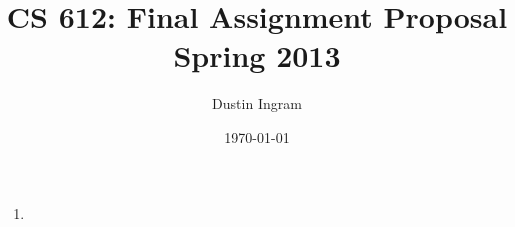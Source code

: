 \documentclass{article}
\title{CS 612: Final Assignment Proposal \\Spring 2013}
\author{Dustin Ingram}
\date{\today}
\begin{document}
\maketitle

\section*{}

\begin{enumerate}[label=(\alph*)]

\item{} %

\end{enumerate}
\end{document}
